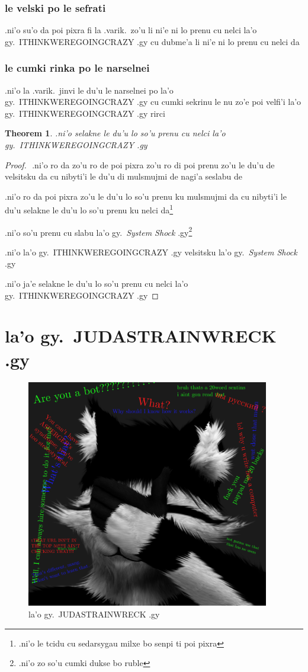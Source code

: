 \documentclass{report}
\newtheorem{thm}{Theorem}
\begin{document}
\subsection{le velski po le sefrati}
.ni'o su'o da poi pixra fi la .varik.\ zo'u li ni'e ni lo prenu cu nelci la'o gy.\ ITHINKWEREGOINGCRAZY .gy cu dubme'a li ni'e ni lo prenu cu nelci da
\subsection{le cumki rinka po le narselnei}
.ni'o la .varik.\ jinvi le du'u le narselnei po la'o gy.\ ITHINKWEREGOINGCRAZY .gy  cu cumki sekrinu le nu zo'e poi velfi'i la'o gy.\ ITHINKWEREGOINGCRAZY .gy rirci
\begin{thm}
.ni'o selakne le du'u lo so'u prenu cu nelci la'o gy.\ ITHINKWEREGOINGCRAZY .gy
\end{thm}
\begin{proof}
${}$
.ni'o ro da zo'u ro de poi pixra zo'u ro di poi prenu zo'u le du'u de velsitsku da cu nibyti'i le du'u di mulsmujmi de nagi'a seslabu de

.ni'o ro da poi pixra zo'u le du'u lo so'u prenu ku mulsmujmi da cu nibyti'i le du'u selakne le du'u lo so'u prenu ku nelci da\footnote{.ni'o le tcidu cu sedarsygau milxe bo senpi ti poi pixra}

.ni'o so'u prenu cu slabu la'o gy.\ \textit{System Shock} .gy\footnote{.ni'o zo so'u cumki dukse bo ruble}

.ni'o la'o gy.\ ITHINKWEREGOINGCRAZY .gy velsitsku la'o gy.\ \textit{System Shock} .gy

.ni'o ja'e selakne le du'u lo so'u prenu cu nelci la'o gy.\ ITHINKWEREGOINGCRAZY .gy
\end{proof}
\chapter{la'o gy.\ JUDASTRAINWRECK .gy}
\begin{figure}[ht]
	\centering
	\includegraphics[height=10cm]{judastrainwreck/judastrainwreck.png}
	\caption[center]{la'o gy.\ JUDASTRAINWRECK .gy}
\end{figure}
\end{document}
